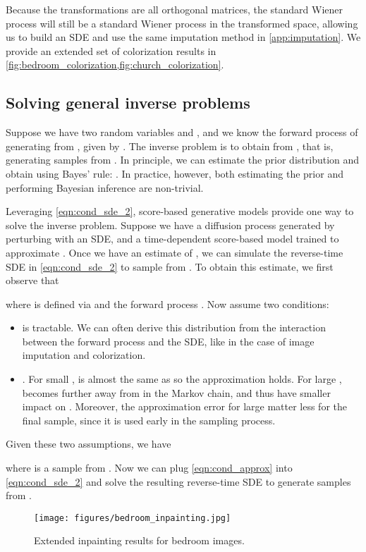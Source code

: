 \documentclass{article} \usepackage{iclr2021_conference,times}
\begin{document}
Because the transformations are all orthogonal matrices, the standard Wiener process  will still be a standard Wiener process in the transformed space, allowing us to build an SDE and use the same imputation method in \cref{app:imputation}. We provide an extended set of colorization results in \cref{fig:bedroom_colorization,fig:church_colorization}.

\subsection{Solving general inverse problems}\label{app:inverse_prob}
Suppose we have two random variables  and , and we know the forward process of generating  from , given by . The inverse problem is to obtain  from , that is, generating samples from . In principle, we can estimate the prior distribution  and obtain  using Bayes' rule: . In practice, however, both estimating the prior and performing Bayesian inference are non-trivial.

Leveraging \cref{eqn:cond_sde_2}, score-based generative models provide one way to solve the inverse problem. Suppose we have a diffusion process  generated by perturbing  with an SDE, and a time-dependent score-based model  trained to approximate . Once we have an estimate of , we can simulate the reverse-time SDE in \cref{eqn:cond_sde_2} to sample from . To obtain this estimate, we first observe that

where  is defined via  and the forward process . Now assume two conditions:
\begin{itemize}
    \item  is tractable. We can often derive this distribution from the interaction between the forward process and the SDE, like in the case of image imputation and colorization.
    \item . For small ,  is almost the same as  so the approximation holds. For large ,  becomes further away from  in the Markov chain, and thus have smaller impact on . Moreover, the approximation error for large  matter less for the final sample, since it is used early in the sampling process.
\end{itemize}
Given these two assumptions, we have

where  is a sample from . Now we can plug \cref{eqn:cond_approx} into \cref{eqn:cond_sde_2} and solve the resulting reverse-time SDE to generate samples from .

\begin{figure}
    \centering
    \texttt{[image: figures/bedroom\_inpainting.jpg]}
    \caption{Extended inpainting results for  bedroom images.}
    \label{fig:bedroom_inpainting}
\end{figure}
\end{document}

